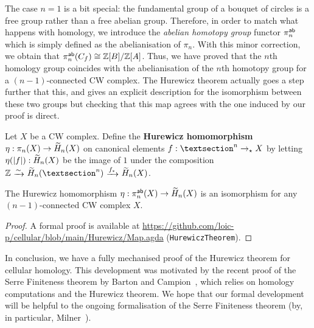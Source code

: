 \documentclass[a4page]{article}
\begin{document}
The case \( n = 1 \) is a bit special: the fundamental group of a bouquet of circles is a
free group rather than a free abelian group. Therefore, in order to match what happens with homology,
we introduce the \emph{abelian homotopy group} functor \( \textnormal{\ensuremath{{\pi}_{n}^{\mathsf{ab}}}} \) which is simply defined as the
abelianisation of \( \pi_n \).
%
With this minor correction, we obtain that $\textnormal{\ensuremath{{\pi}_{n}^{\mathsf{ab}}}}(C_f) \cong \mathbb{Z}[B]/\mathbb{Z}[A]$.
%
Thus, we have proved that the \( n \)th homology group coincides with the abelianisation of the
\( n \)th homotopy group for a \( (n - 1) \)-connected CW complex.
%
The Hurewicz theorem actually goes a step further that this, and gives an explicit description
for the isomorphism between these two groups but checking that this map agrees with the one induced by our proof is direct.
%
\begin{theorem}
  Let $X$ be a CW complex.
  Define the \textbf{Hurewicz homomorphism} $\eta : \pi_n(X) \to \textnormal{\ensuremath{\widetilde{H}_{n}}}(X)$ on canonical
  elements $f : \sphere{n} \to_\star X$ by letting $\eta(\left| f \right|) : \textnormal{\ensuremath{\widetilde{H}_{n}}}(X)$ be the image
  of $1$ under the composition
  \( \bZ\ \raisemath{-1pt}{\xrightarrow{\sim}}\ \hredcw{n}(\sphere{n})
  \ \raisemath{-1pt}{\xrightarrow{f_*}}\ \hredcw{n}{(X)} \).
\end{theorem}

\begin{theorem}
  The Hurewicz homomorphism $\eta : \textnormal{\ensuremath{{\pi}_{n}^{\mathsf{ab}}}}(X) \to \textnormal{\ensuremath{\widetilde{H}_{n}}}(X)$ is an isomorphism for any
  $(n-1)$-connected CW complex $X$.
\end{theorem}

\begin{proof}
  A formal proof is available at \url{https://github.com/loic-p/cellular/blob/main/Hurewicz/Map.agda}
  (\texttt{HurewiczTheorem}).
\end{proof}

In conclusion, we have a fully mechanised proof of the Hurewicz theorem for cellular homology.
%
This development was motivated by the recent proof of the Serre Finiteness theorem by Barton and
Campion~\cite{SerreFiniteness}, which relies on homology computations and the Hurewicz theorem.
%
We hope that our formal development will be helpful to the ongoing formalisation of the Serre
Finiteness theorem (by, in particular, Milner~\cite{MilnerTalk}).

\printbibliography
\end{document}
